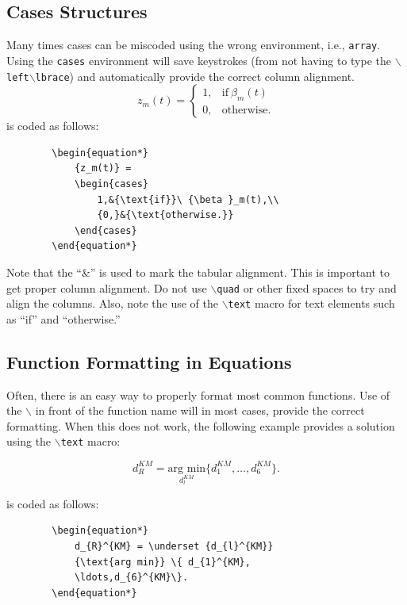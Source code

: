 \documentclass[lettersize,journal]{IEEEtran}
\begin{document}
	
	\subsection{Cases Structures}
	Many times cases can be miscoded using the wrong environment, i.e., {\tt{array}}. Using the {\tt{cases}} environment will save keystrokes (from not having to type the $\backslash${\tt{left}}$\backslash${\tt{lbrace}}) and automatically provide the correct column alignment.
	\begin{equation*}
		{z_m(t)} = \begin{cases}
			1,&{\text{if}}\ {\beta }_m(t) \\ 
			{0,}&{\text{otherwise.}} 
		\end{cases}
	\end{equation*}
	\noindent is coded as follows:
	\begin{verbatim}
		\begin{equation*}
			{z_m(t)} = 
			\begin{cases}
				1,&{\text{if}}\ {\beta }_m(t),\\ 
				{0,}&{\text{otherwise.}} 
			\end{cases}
		\end{equation*}
	\end{verbatim}
	\noindent Note that the ``\&'' is used to mark the tabular alignment. This is important to get  proper column alignment. Do not use $\backslash${\tt{quad}} or other fixed spaces to try and align the columns. Also, note the use of the $\backslash${\tt{text}} macro for text elements such as ``if'' and ``otherwise.''
	
	\subsection{Function Formatting in Equations}
	Often, there is an easy way to properly format most common functions. Use of the $\backslash$ in front of the function name will in most cases, provide the correct formatting. When this does not work, the following example provides a solution using the $\backslash${\tt{text}} macro:
	
	\begin{equation*} 
		d_{R}^{KM} = \underset {d_{l}^{KM}} {\text{arg min}} \{ d_{1}^{KM},\ldots,d_{6}^{KM}\}.
	\end{equation*}
	
	\noindent is coded as follows:
	\begin{verbatim}
		\begin{equation*} 
			d_{R}^{KM} = \underset {d_{l}^{KM}} 
			{\text{arg min}} \{ d_{1}^{KM},
			\ldots,d_{6}^{KM}\}.
		\end{equation*}
	\end{verbatim}
	
\end{document}

